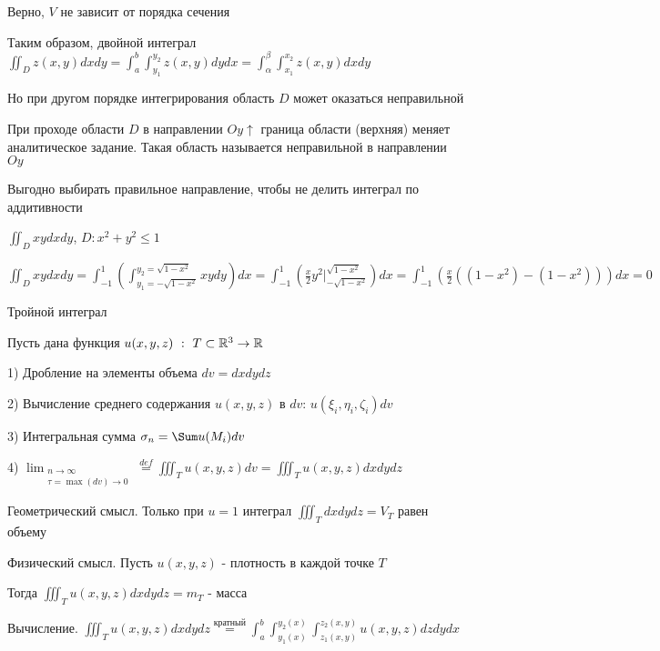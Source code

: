 \documentclass[12pt]{article}
\begin{document}
    Верно, $V$ не зависит от порядка сечения

    Таким образом, двойной интеграл $\iint_D z(x, y) dxdy = \int_a^b \int_{y_1}^{y_2} z(x, y) dydx = \int_\alpha^\beta \int_{x_1}^{x_2} z(x, y) dxdy$

    Но при другом порядке интегрирования область $D$ может оказаться неправильной

    \Def При проходе области $D$ в направлении $Oy \uparrow$ граница области (верхняя) меняет аналитическое задание. Такая область называется неправильной в направлении $Oy$

    Выгодно выбирать правильное направление, чтобы не делить интеграл по аддитивности

    \Ex $\iint_D xy dx dy$, $D : x^2 + y^2 \leq 1$

    $\iint_D xy dx dy = \int_{-1}^1 \left(\int_{y_1 = -\sqrt{1-x^2}}^{y_2 = \sqrt{1-x^2}} xy dy\right) dx = \int_{-1}^1 \left(\frac{x}{2} y^2 \Big|_{-\sqrt{1-x^2}}^{\sqrt{1-x^2}}\right) dx =
    \int_{-1}^1 \left(\frac{x}{2} ((1 - x^2) - (1 - x^2))\right) dx = 0$

    \hypertarget{tripleintegral}{}

    \Def Тройной интеграл

    Пусть дана функция $u(x, y, z) \ : \ T \subset \mathbb{R}^3 \rightarrow \mathbb{R}$

    1) Дробление на элементы объема $dv = dxdydz$

    2) Вычисление среднего содержания $u(x, y, z)$ в $dv$: $u(\xi_i, \eta_i, \zeta_i) dv$

    3) Интегральная сумма $\sigma_n = \Sum u(M_i) dv$

    4) $\lim_{\substack{n \to \infty \\ \tau = \max (dv) \to 0}} \stackrel{def}{=} \iiint_T u(x, y, z) dv = \iiint_T u(x, y, z) dxdydz$

    Геометрический смысл. Только при $u = 1$ интеграл $\iiint_T dxdydz = V_T$ равен объему

    Физический смысл. Пусть $u(x, y, z)$ - плотность в каждой точке $T$

    Тогда $\iiint_T u(x, y, z) dxdydz = m_T$ - масса

    \hypertarget{tripleintegralcalculation}{}

    Вычисление. $\iiint_T u(x, y, z) dxdydz \stackrel{\text{кратный}}{=} \int^b_a \int_{y_1(x)}^{y_2(x)} \int_{z_1(x, y)}^{z_2(x, y)} u(x, y, z) dz dy dx$
\end{document}
